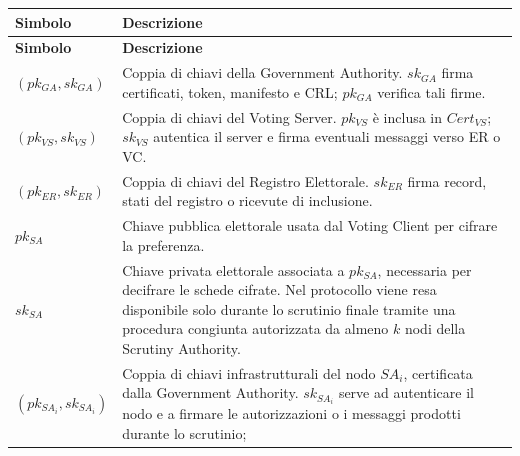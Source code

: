 \documentclass[a4paper,12pt]{article}
\begin{document}
\begin{longtable}{|>{\raggedright\arraybackslash}p{}|>{\raggedright\arraybackslash}p{}|}
	\hline
	\rowcolor{HeaderBlue}\textbf{Simbolo} & \textbf{Descrizione}                                                                                                                            \\
	\hline
	\endfirsthead
	\hline
	\rowcolor{HeaderBlue}\textbf{Simbolo} & \textbf{Descrizione}                                                                                                                            \\
	\hline
	\endhead
	$(pk_{GA}, sk_{GA})$                  & Coppia di chiavi della Government Authority. $sk_{GA}$ firma certificati, token, manifesto e CRL; $pk_{GA}$ verifica tali firme.                \\
	\hline
	$(pk_{VS}, sk_{VS})$                  & Coppia di chiavi del Voting Server. $pk_{VS}$ è inclusa in $Cert_{VS}$; $sk_{VS}$ autentica il server e firma eventuali messaggi verso ER o VC. \\
	\hline
	$(pk_{ER}, sk_{ER})$                  & Coppia di chiavi del Registro Elettorale. $sk_{ER}$ firma record, stati del registro o ricevute di inclusione.                                  \\
	\hline
	$pk_{SA}$                             & Chiave pubblica elettorale usata dal Voting Client per cifrare la preferenza.                                                                   \\
	\hline
    $sk_{SA}$ & Chiave privata elettorale associata a $pk_{SA}$, necessaria per decifrare le schede cifrate. Nel protocollo viene resa disponibile solo durante lo scrutinio finale tramite una procedura congiunta autorizzata da almeno \(k\) nodi della Scrutiny Authority. \\
    \hline
    $(pk_{SA_i}, sk_{SA_i})$ & Coppia di chiavi infrastrutturali del nodo \(SA_i\), certificata dalla Government Authority. \(sk_{SA_i}\) serve ad autenticare il nodo e a firmare le autorizzazioni o i messaggi prodotti durante lo scrutinio;  \\ \hline
    

\end{longtable}
\end{document}
